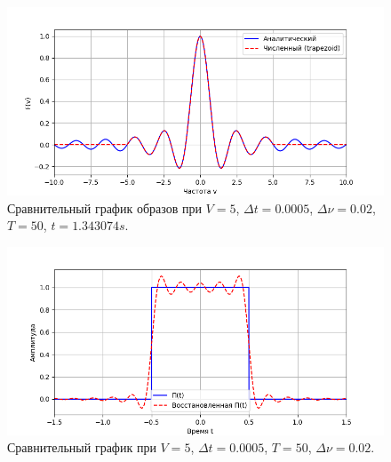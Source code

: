 \documentclass[a4paper]{article}
\begin{document}
\begin{figure}[H]
  \centering
  \includegraphics[width=\textwidth]{src/task_1_1/freq_50_0.0005_5_0.02.png}
  \caption{Сравнительный график образов при $V=5$, $\Delta t=0.0005$, $\Delta \nu=0.02$, $T=50$, $t=1.343074 s$.} 
\end{figure}
\begin{figure}[H]
  \centering
  \includegraphics[width=\textwidth]{src/task_1_1/time_50_0.0005_5_0.02.png}
  \caption{Сравнительный график при $V=5$, $\Delta t=0.0005$, $T=50$, $\Delta \nu=0.02$.}
\end{figure}
\end{document}
